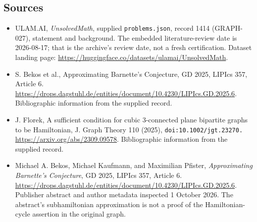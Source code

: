 \documentclass[11pt,a4paper]{article}
\begin{document}
\subsection{Sources}

{\small

\begin{itemize}

\item[\hypertarget{source:1414:1}{S1}] ULAM.AI, \emph{UnsolvedMath}, supplied \texttt{problems.json}, record 1414 (GRAPH-027), statement and background. The embedded literature-review date is 2026-08-17; that is the archive’s review date, not a fresh certification. Dataset landing page: \url{https://huggingface.co/datasets/ulamai/UnsolvedMath}.

\item[\hypertarget{source:1414:2}{S2}] S. Bekos et al., Approximating Barnette's Conjecture, GD 2025, LIPIcs 357, Article 6. \url{https://drops.dagstuhl.de/entities/document/10.4230/LIPIcs.GD.2025.6}. Bibliographic information from the supplied record.

\item[\hypertarget{source:1414:3}{S3}] J. Florek, A sufficient condition for cubic 3-connected plane bipartite graphs to be Hamiltonian, J. Graph Theory 110 (2025), \nolinkurl{doi:10.1002/jgt.23270.} \url{https://arxiv.org/abs/2309.09578}. Bibliographic information from the supplied record.


\item[E1] Michael A. Bekos, Michael Kaufmann, and
Maximilian Pfister, \emph{Approximating Barnette's Conjecture}, GD 2025,
LIPIcs 357, Article 6. \url{https://drops.dagstuhl.de/entities/document/10.4230/LIPIcs.GD.2025.6}.
Publisher abstract and author metadata inspected 1 October 2026.
The abstract's subhamiltonian approximation is not a proof of the
Hamiltonian-cycle assertion in the original graph.

\end{itemize}

}

\label{end:1414}
\end{document}
